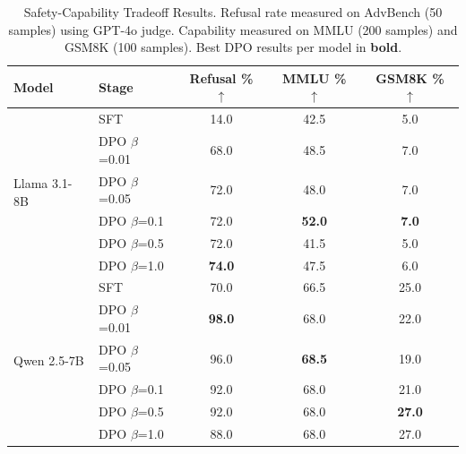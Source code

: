 
\begin{table}[t]
\centering
\caption{Safety-Capability Tradeoff Results. Refusal rate measured on AdvBench (50 samples) using GPT-4o judge. Capability measured on MMLU (200 samples) and GSM8K (100 samples). Best DPO results per model in \textbf{bold}.}
\label{tab:main_results}
\begin{tabular}{llccc}
\toprule
\textbf{Model} & \textbf{Stage} & \textbf{Refusal \%} $\uparrow$ & \textbf{MMLU \%} $\uparrow$ & \textbf{GSM8K \%} $\uparrow$ \\
\midrule
\multirow{6}{*}{Llama 3.1-8B}
 & SFT & 14.0 & 42.5 & 5.0 \\
 & DPO $\beta$=0.01 & 68.0 & 48.5 & 7.0 \\
 & DPO $\beta$=0.05 & 72.0 & 48.0 & 7.0 \\
 & DPO $\beta$=0.1 & 72.0 & \textbf{52.0} & \textbf{7.0} \\
 & DPO $\beta$=0.5 & 72.0 & 41.5 & 5.0 \\
 & DPO $\beta$=1.0 & \textbf{74.0} & 47.5 & 6.0 \\
\midrule
\multirow{6}{*}{Qwen 2.5-7B}
 & SFT & 70.0 & 66.5 & 25.0 \\
 & DPO $\beta$=0.01 & \textbf{98.0} & 68.0 & 22.0 \\
 & DPO $\beta$=0.05 & 96.0 & \textbf{68.5} & 19.0 \\
 & DPO $\beta$=0.1 & 92.0 & 68.0 & 21.0 \\
 & DPO $\beta$=0.5 & 92.0 & 68.0 & \textbf{27.0} \\
 & DPO $\beta$=1.0 & 88.0 & 68.0 & 27.0 \\
\bottomrule
\end{tabular}
\end{table}
